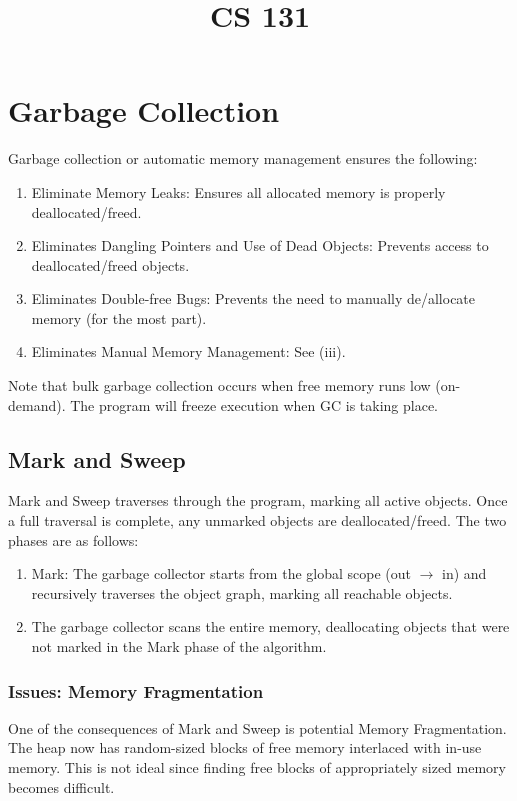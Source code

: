 \documentclass{article}
\title{CS 131}
\date{}
\begin{document}
\maketitle

\tableofcontents

\newpage
\section{Garbage Collection}
Garbage collection or automatic memory management ensures the
following:
\begin{enumerate}[label=(\roman*)]
\item Eliminate Memory Leaks: Ensures all allocated memory is properly
  deallocated/freed.
\item Eliminates Dangling Pointers and Use of Dead Objects: Prevents
  access to deallocated/freed objects.
\item Eliminates Double-free Bugs: Prevents the need to manually
  de/allocate memory (for the most part).
\item Eliminates Manual Memory Management: See (iii).
\end{enumerate}
Note that bulk garbage collection occurs when free memory runs low
(on-demand). The program will freeze execution when GC is taking place.


\subsection{Mark and Sweep}
Mark and Sweep traverses through the program, marking all active
objects. Once a full traversal is complete, any unmarked objects are
deallocated/freed. The two phases are as follows:
\begin{enumerate}[label=(\roman*)]
\item Mark: The garbage collector starts from the global scope (out $\to$ in) and
recursively traverses the object graph, marking all reachable
objects.
\item The garbage collector scans the entire memory, deallocating objects
that were not marked in the Mark phase of the algorithm.
\end{enumerate}



\subsubsection{Issues: Memory Fragmentation}
One of the consequences of Mark and Sweep is potential Memory
Fragmentation. The heap now has random-sized blocks of free memory
interlaced with in-use memory. This is not ideal since finding free
blocks of appropriately sized memory becomes difficult. 
\end{document}
